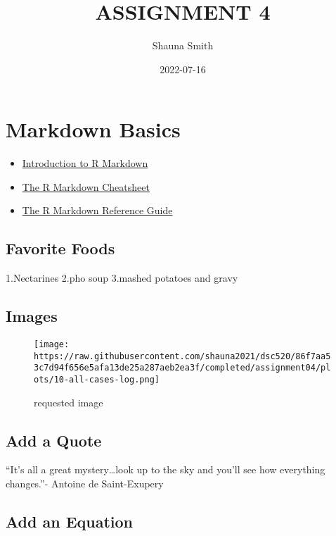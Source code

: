 \documentclass[
]{article}
\title{ASSIGNMENT 4}
\author{Shauna Smith}
\date{2022-07-16}
\providecommand{\tightlist}{%
  \setlength{\itemsep}{0pt}\setlength{\parskip}{0pt}}
\begin{document}
\maketitle

\hypertarget{markdown-basics}{%
\section{Markdown Basics}\label{markdown-basics}}

\begin{itemize}
\tightlist
\item
  \href{https://rmarkdown.rstudio.com/lesson-1.html}{Introduction to R
  Markdown}
\item
  \href{https://www.rstudio.com/wp-content/uploads/2016/03/rmarkdown-cheatsheet-2.0.pdf}{The
  R Markdown Cheatsheet}
\item
  \href{https://www.rstudio.com/wp-content/uploads/2015/03/rmarkdown-reference.pdf}{The
  R Markdown Reference Guide}
\end{itemize}

\hypertarget{favorite-foods}{%
\subsection{Favorite Foods}\label{favorite-foods}}

1.Nectarines 2.pho soup 3.mashed potatoes and gravy

\hypertarget{images}{%
\subsection{Images}\label{images}}

\begin{figure}
\centering
\texttt{[image: https://raw.githubusercontent.com/shauna2021/dsc520/86f7aa53c7d94f656e5afa13de25a287aeb2ea3f/completed/assignment04/plots/10-all-cases-log.png]}
\caption{requested image}
\end{figure}

\hypertarget{add-a-quote}{%
\subsection{Add a Quote}\label{add-a-quote}}

``It's all a great mystery\ldots look up to the sky and you'll see how
everything changes.''- Antoine de Saint-Exupery

\hypertarget{add-an-equation}{%
\subsection{Add an Equation}\label{add-an-equation}}
\end{document}
